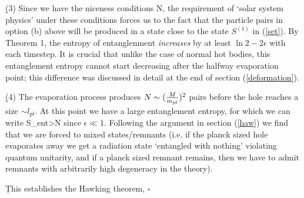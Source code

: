 \documentclass[12pt]{article}
\begin{document}
\b

(3) Since we have the niceness conditions N, the requirement of `solar system physics' under these conditions forces us to the fact that the particle pairs in option (b) above will be produced in a state close to the state $S^{(1)}$ in (\ref{set}). By Theorem 1, the entropy of entanglenment {\it increases} by at least $\ln 2-2\epsilon$ with each timestep. It is crucial that unlike the case of normal hot bodies, this entanglement entropy cannot start decreasing after the halfway evaporation point; this difference was discussed in detail at the end of section (\ref{deformation}).

\b

(4) The evaporation process produces $N\sim ({M\over m_{pl}})^2$ pairs before the hole reaches a size $\sim l_{pl}$. At this point we have a large entanglement entropy, for which we can write 
\be
S_{ent}>{N}
\ee
since $\epsilon \ll 1$. Following the argument in section (\ref{haw}) we find that we are forced to mixed states/remnants (i.e. if the planck sized hole evaporates away we get a radiation state `entangled with nothing' violating quantum unitarity, and if a planck sized remnant remains, then we have to admit remnants with arbitrarily high degeneracy in the theory). 

\b

This establishes the Hawking theorem, \quad $\square$
\end{document}
